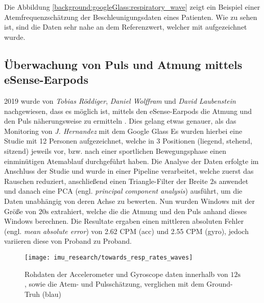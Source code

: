 Die Abbildung \ref{background:googleGlass:respiratory_wave} zeigt ein Beispiel einer Atemfrequenzschätzung der Beschleunigungsdaten eines Patienten. Wie zu sehen ist, sind die Daten sehr nahe an dem Referenzwert, welcher mit aufgezeichnet wurde.


\subsection{Überwachung von Puls und Atmung mittels eSense-Earpods}
2019 wurde von \textit{Tobias Röddiger}, \textit{Daniel Wolffram} und \textit{David Laubenstein} nachgewiesen, dass es möglich ist, mittels den eSense-Earpods die Atmung und den Puls näherungsweise zu ermitteln \cite{roddiger_towards_2019}. 
Dies gelang etwas genauer, als das Monitoring von \textit{J. Hernandez} mit dem Google Glass \cite{hernandez_cardiac_nodate}
Es wurden hierbei eine Studie mit 12 Personen aufgezeichnet, welche in 3 Positionen (liegend, stehend, sitzend) jeweils vor, bzw. nach einer sportlichen Bewegungsphase einen einminütigen Atemablauf durchgeführt haben. 
Die Analyse der Daten erfolgte im Anschluss der Studie und wurde in einer Pipeline verarbeitet, welche zuerst das Rauschen reduziert, anschließend einen Triangle-Filter der Breite $2\si{\s}$ anwendet und danach eine PCA (engl. \textit{principal component analysis}) ausführt, um die Daten unabhängig von deren Achse zu bewerten.
Nun wurden Windows mit der Größe von $20\si{\s}$ extrahiert, welche die die Atmung und den Puls anhand dieses Windows berechnen.
Die Resultate ergaben einen mittleren absoluten Fehler (engl. \textit{mean absolute error}) von 2.62 CPM (acc) und 2.55 CPM (gyro), jedoch variieren diese von Proband zu Proband.


\begin{figure}[ht]
    \texttt{[image: imu\_research/towards\_resp\_rates\_waves]}
    \caption{Rohdaten der Accelerometer und Gyroscope daten innerhalb von $12 \si{\s}$, sowie die Atem- und Pulsschätzung, verglichen mit dem Ground-Truh (blau)}
    \label{background:towards_resp_esense:results}
\end{figure}